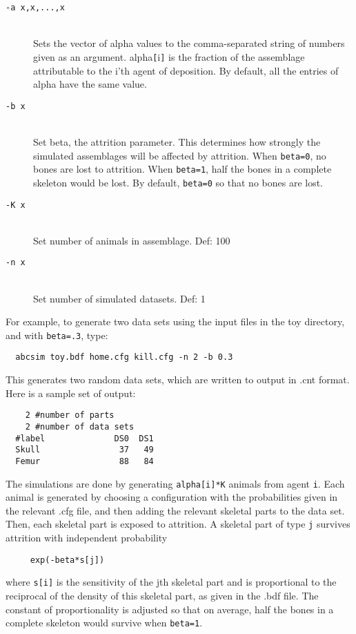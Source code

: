 \begin{description}

\item[{\tt -a x,x,...,x}]%
%
\hfil\\
Sets the vector of alpha values to the comma-separated string of
numbers given as an argument.  alpha{\tt [}i{\tt ]} is the fraction of the
assemblage attributable to the i'th agent of deposition.  By default,
all the entries of alpha have the same value.

\item[{\tt -b x}]%
%
\hfil\\
Set beta, the attrition parameter.  This determines how strongly the
simulated assemblages will be affected by attrition.  When {\tt beta=0},
no bones are lost to attrition.  When {\tt beta=1}, half the bones in a
complete skeleton would be lost.  By default, {\tt beta=0} so that no
bones are lost.

\item[{\tt -K x}]%
%
\hfil\\
Set number of animals in assemblage. Def: 100

\item[{\tt -n x}]%
%
\hfil\\
Set number of simulated datasets. Def: 1

\end{description}

For example, to generate two data sets using the input files in the
toy directory, and with {\tt beta=.3}, type:
\begin{verbatim}
  abcsim toy.bdf home.cfg kill.cfg -n 2 -b 0.3
\end{verbatim}

This generates two random data sets, which are written to output in
.cnt format.  Here is a sample set of output:
\begin{verbatim}
    2 #number of parts
    2 #number of data sets
  #label              DS0  DS1
  Skull                37   49
  Femur                88   84
\end{verbatim}

The simulations are done by generating {\tt alpha[i]*K} animals from
agent {\tt i}.  Each animal is generated by choosing a configuration with
the probabilities given in the relevant .cfg file, and then adding the
relevant skeletal parts to the data set.  Then, each skeletal part is
exposed to attrition.  A skeletal part of type {\tt j} survives attrition
with independent probability
\begin{verbatim}
     exp(-beta*s[j])
\end{verbatim}

where {\tt s[i]} is the sensitivity of the jth skeletal part and is
proportional to the reciprocal of the density of this skeletal part,
as given in the .bdf file.  The constant of proportionality is
adjusted so that on average, half the bones in a complete skeleton
would survive when {\tt beta=1}.  
